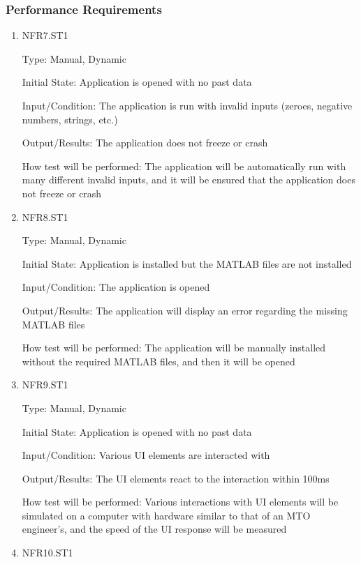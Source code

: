 \documentclass[12pt, titlepage]{article}
\begin{document}
\subsubsection{Performance Requirements}

\begin{enumerate}

\item{NFR7.ST1\\}

Type: Manual, Dynamic

Initial State: Application is opened with no past data

Input/Condition: The application is run with invalid inputs (zeroes, negative numbers, strings, etc.)

Output/Results: The application does not freeze or crash

How test will be performed: The application will be automatically run with many different invalid inputs, and it will be ensured that the application does not freeze or crash

\item{NFR8.ST1\\}

Type: Manual, Dynamic

Initial State: Application is installed but the MATLAB files are not installed

Input/Condition: The application is opened

Output/Results: The application will display an error regarding the missing MATLAB files

How test will be performed: The application will be manually installed without the required MATLAB files, and then it will be opened

\item{NFR9.ST1\\}

Type: Manual, Dynamic

Initial State: Application is opened with no past data

Input/Condition: Various UI elements are interacted with

Output/Results: The UI elements react to the interaction within 100ms

How test will be performed: Various interactions with UI elements will be simulated on a computer with hardware similar to that of an MTO engineer's, and the speed of the UI response will be measured

\item{NFR10.ST1\\}


\end{enumerate}
\end{document}
